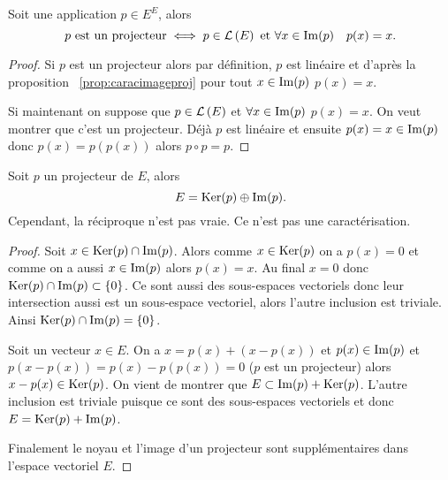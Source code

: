\begin{prop}
  Soit une application \(p \in E^E\), alors
  \begin{equation}
    p \text{~est un projecteur} \iff p \in \mathcal{L}\left(E\right) \text{~et~} \forall x \in 
    \operatorname{Im}(p) \quad p(x)=x.
  \end{equation}
\end{prop}
\begin{proof}
  Si \(p\) est un projecteur alors par définition, \(p\) est linéaire et d'après 
  la proposition~
  \ref{prop:caracimageproj} pour tout \(x \in \operatorname{Im}(p)\) \(p(x)=x\).

  Si maintenant on suppose que \(p \in \mathcal{L}\left(E\right)\) et \(\forall x \in \operatorname{Im}(p)\) 
  \(p(x)=x\). On veut montrer que c'est un projecteur. Déjà \(p\) est linéaire 
  et ensuite \(p(x)=x \in \operatorname{Im}(p)\) donc \(p(x)=p(p(x))\) alors \(p \circ 
  p=p\).
\end{proof}

\begin{prop}\label{prop:projecteursupplementaire}
  Soit \(p\) un projecteur de \(E\), alors
  \begin{equation}
    E = \operatorname{Ker}(p) \oplus \operatorname{Im}(p).
  \end{equation}
  Cependant, la réciproque n'est pas vraie. Ce n'est pas une caractérisation.
\end{prop}
\begin{proof}
  Soit \(x \in \operatorname{Ker}(p) \cap \operatorname{Im}(p)\). Alors comme \(x \in \operatorname{Ker}(p)\) on a 
  \(p(x)=0\) et comme on a aussi \(x \in \operatorname{Im}(p)\) alors \(p(x)=x\). Au final 
  \(x = 0\) donc \(\operatorname{Ker}(p) \cap \operatorname{Im}(p) \subset \{0\}\). Ce sont aussi des 
  sous-espaces vectoriels donc leur intersection aussi est un sous-espace 
  vectoriel, alors l'autre inclusion est triviale. Ainsi \(\operatorname{Ker}(p) \cap 
  \operatorname{Im}(p)=\{0\}\).

  Soit un vecteur \(x \in E\). On a \(x = p(x) +(x-p(x))\) et \(p(x) \in 
  \operatorname{Im}(p)\) et \(p(x-p(x))=p(x)-p(p(x))=0\) (\(p\) est un projecteur) alors 
  \(x-p(x) \in \operatorname{Ker}(p)\). On vient de montrer que \(E \subset \operatorname{Im}(p) + 
  \operatorname{Ker}(p)\). L'autre inclusion est triviale puisque ce sont des sous-espaces 
  vectoriels et donc \(E = \operatorname{Ker}(p) +\operatorname{Im}(p)\).

  Finalement le noyau et l'image d'un projecteur sont supplémentaires dans 
  l'espace vectoriel \(E\).
\end{proof}


